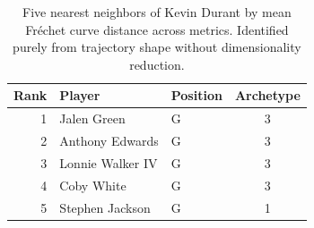 \begin{table}[htbp]
  \centering\small
  \begin{tabular}{rllc}
    \toprule
    Rank & Player & Position & Archetype \\
    \midrule
    1 & Jalen Green & G & 3 \\
    2 & Anthony Edwards & G & 3 \\
    3 & Lonnie Walker IV & G & 3 \\
    4 & Coby White & G & 3 \\
    5 & Stephen Jackson & G & 1 \\
    \bottomrule
  \end{tabular}
  \caption{Five nearest neighbors of Kevin Durant by mean Fr\'{e}chet curve distance across metrics. Identified purely from trajectory shape without dimensionality reduction.}
  \label{tab:Kevin_Durant_frechet_curve_neighbors}
\end{table}

